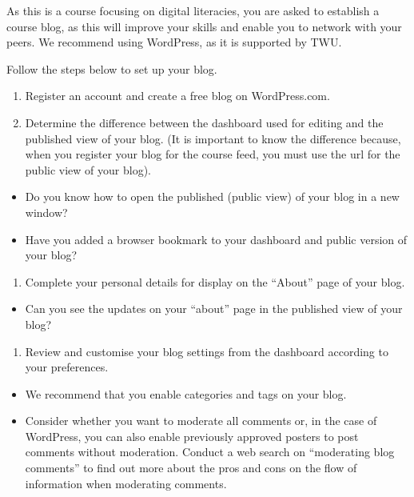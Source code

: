 \documentclass[
]{book}
\providecommand{\tightlist}{%
  \setlength{\itemsep}{0pt}\setlength{\parskip}{0pt}}
\theoremstyle{definition}
\theoremstyle{definition}
\theoremstyle{definition}
\theoremstyle{definition}
\theoremstyle{remark}
\begin{document}
\begin{reflect}
As this is a course focusing on digital literacies, you are asked to establish a course blog, as this will improve your skills and enable you to network with your peers. We recommend using WordPress, as it is supported by TWU.

Follow the steps below to set up your blog.

\begin{enumerate}
\def\labelenumi{\arabic{enumi}.}
\tightlist
\item
  Register an account and create a free blog on WordPress.com.
\item
  Determine the difference between the dashboard used for editing and the published view of your blog. (It is important to know the difference because, when you register your blog for the course feed, you must use the url for the public view of your blog).
\end{enumerate}

\begin{itemize}
\tightlist
\item
  Do you know how to open the published (public view) of your blog in a new window?
\item
  Have you added a browser bookmark to your dashboard and public version of your blog?
\end{itemize}

\begin{enumerate}
\def\labelenumi{\arabic{enumi}.}
\tightlist
\item
  Complete your personal details for display on the ``About'' page of your blog.
\end{enumerate}

\begin{itemize}
\tightlist
\item
  Can you see the updates on your ``about'' page in the published view of your blog?
\end{itemize}

\begin{enumerate}
\def\labelenumi{\arabic{enumi}.}
\tightlist
\item
  Review and customise your blog settings from the dashboard according to your preferences.
\end{enumerate}

\begin{itemize}
\tightlist
\item
  We recommend that you enable categories and tags on your blog.
\item
  Consider whether you want to moderate all comments or, in the case of WordPress, you can also enable previously approved posters to post comments without moderation. Conduct a web search on ``moderating blog comments'' to find out more about the pros and cons on the flow of information when moderating comments.
\end{itemize}


\end{reflect}
\end{document}
